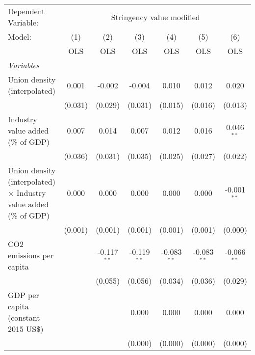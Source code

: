 
\begingroup
\centering
\begin{tabular}{lcccccc}
   \toprule
   Dependent Variable: & \multicolumn{6}{c}{Stringency value modified}\\
   Model:                                                                   & (1)     & (2)           & (3)           & (4)           & (5)           & (6)\\  
                                                                            &  OLS    & OLS           & OLS           & OLS           & OLS           & OLS\\  
   \midrule
   \emph{Variables}\\
   Union density (interpolated)                                             & 0.001   & -0.002        & -0.004        & 0.010         & 0.012         & 0.020\\   
                                                                            & (0.031) & (0.029)       & (0.031)       & (0.015)       & (0.016)       & (0.013)\\   
   Industry value added (\% of GDP)                                         & 0.007   & 0.014         & 0.007         & 0.012         & 0.016         & 0.046$^{**}$\\   
                                                                            & (0.036) & (0.031)       & (0.035)       & (0.025)       & (0.027)       & (0.022)\\   
   Union density (interpolated) $\times$ Industry value added (\% of GDP)   & 0.000   & 0.000         & 0.000         & 0.000         & 0.000         & -0.001$^{**}$\\   
                                                                            & (0.001) & (0.001)       & (0.001)       & (0.001)       & (0.001)       & (0.000)\\   
   CO2 emissions per capita                                                 &         & -0.117$^{**}$ & -0.119$^{**}$ & -0.083$^{**}$ & -0.083$^{**}$ & -0.066$^{**}$\\   
                                                                            &         & (0.055)       & (0.056)       & (0.034)       & (0.036)       & (0.029)\\   
   GDP per capita (constant 2015 US\$)                                      &         &               & 0.000         & 0.000         & 0.000         & 0.000\\   
                                                                            &         &               & (0.000)       & (0.000)       & (0.000)       & (0.000)\\   

\end{tabular}
